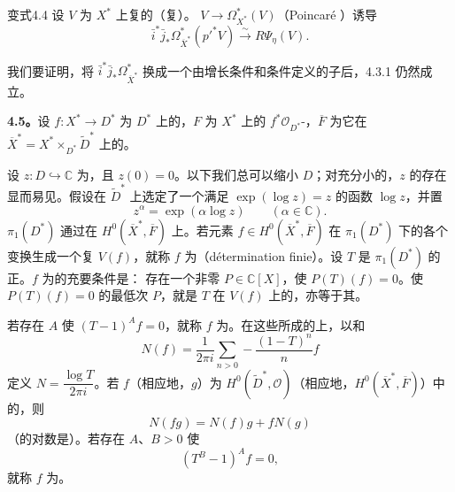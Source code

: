 \begin{SGAresult}{变式}{4.4}
设 $V$ 为 $X^*$ 上复的（复）。 $V\to\Omega_{X^*}^*(V)$（Poincaré ）诱导
\[
 \bar i^*\bar j_*\Omega_{\overline X^*}^*(p'^*V)\xrightarrow{\sim}R\Psi_\eta(V).\tag{4.4.1}
\]
\end{SGAresult}
我们要证明，将 $\bar i^*\bar j_*\Omega_{\overline X^*}^*$ 换成一个由增长条件和条件定义的子后，4.3.1 仍然成立。

\textbf{4.5。}设 $f:X^*\to D^*$ 为 $D^*$ 上的，$F$ 为 $X^*$ 上的 $f^*\mathscr O_{D^*}$-，$\overline F$ 为它在 $\overline X^*=X^*\times_{D^*}\widetilde D^*$ 上的。

设 $z:D\hookrightarrow\mathbb C$ 为，且 $z(0)=0$。以下我们总可以缩小 $D$；对充分小的，$z$ 的存在显而易见。假设在 $\widetilde D^*$ 上选定了一个满足 $\exp(\log z)=z$ 的函数 $\log z$，并置
\[
 z^\alpha=\exp(\alpha\log z)\qquad(\alpha\in\mathbb C).
\]
 $\pi_1(D^*)$ 通过在 $H^0(\overline X^*,\overline F)$ 上。若元素 $f\in H^0(\overline X^*,\overline F)$ 在 $\pi_1(D^*)$ 下的各个变换生成一个复 $V(f)$，就称 $f$ 为（détermination finie）。设 $T$ 是 $\pi_1(D^*)$ 的正。$f$ 为的充要条件是：
存在一个非零 $P\in\mathbb C[X]$，使 $P(T)(f)=0$。使 $P(T)(f)=0$ 的最低次 $P$，就是 $T$ 在 $V(f)$ 上的，亦等于其。

若存在 $A$ 使 $(T-1)^Af=0$，就称 $f$ 为。在这些所成的上，以和
\[
 N(f)=\frac1{2\pi i}\sum_{n>0}-\frac{(1-T)^n}{n}f
\]
定义 $N=\dfrac{\log T}{2\pi i}$。若 $f$（相应地，$g$）为 $H^0(\widetilde D^*,\mathscr O)$（相应地，$H^0(\overline X^*,\overline F)$）中的，则
\[
 N(fg)=N(f)g+fN(g)
\]
（的对数是）。若存在 $A$、$B>0$ 使
\[
 (T^B-1)^Af=0,
\]
就称 $f$ 为。

